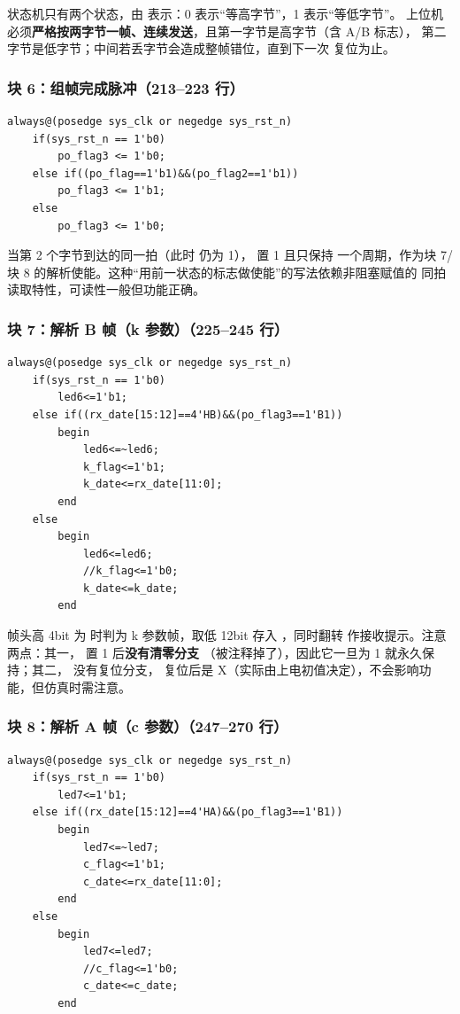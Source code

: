 状态机只有两个状态，由  表示：0 表示“等高字节”，1 表示“等低字节”。
上位机必须\textbf{严格按两字节一帧、连续发送}，且第一字节是高字节（含 A/B 标志），
第二字节是低字节；中间若丢字节会造成整帧错位，直到下一次  复位为止。

\subsubsection{块 6：组帧完成脉冲（213--223 行）}

\begin{lstlisting}[style=vsnip]
always@(posedge sys_clk or negedge sys_rst_n)
    if(sys_rst_n == 1'b0)
        po_flag3 <= 1'b0;
    else if((po_flag==1'b1)&&(po_flag2==1'b1))
        po_flag3 <= 1'b1;
    else
        po_flag3 <= 1'b0;
\end{lstlisting}

当第 2 个字节到达的同一拍（此时  仍为 1）， 置 1 且只保持
一个周期，作为块 7/块 8 的解析使能。这种“用前一状态的标志做使能”的写法依赖非阻塞赋值的
同拍读取特性，可读性一般但功能正确。

\subsubsection{块 7：解析 B 帧（k 参数）（225--245 行）}

\begin{lstlisting}[style=vsnip]
always@(posedge sys_clk or negedge sys_rst_n)
    if(sys_rst_n == 1'b0)
        led6<=1'b1;
    else if((rx_date[15:12]==4'HB)&&(po_flag3==1'B1))
        begin
            led6<=~led6;
            k_flag<=1'b1;
            k_date<=rx_date[11:0];
        end
    else
        begin
            led6<=led6;
            //k_flag<=1'b0;
            k_date<=k_date;
        end
\end{lstlisting}

帧头高 4bit 为  时判为 k 参数帧，取低 12bit 存入 ，同时翻转
 作接收提示。注意两点：其一， 置 1 后\textbf{没有清零分支}
（被注释掉了），因此它一旦为 1 就永久保持；其二， 没有复位分支，
复位后是 X（实际由上电初值决定），不会影响功能，但仿真时需注意。

\subsubsection{块 8：解析 A 帧（c 参数）（247--270 行）}

\begin{lstlisting}[style=vsnip]
always@(posedge sys_clk or negedge sys_rst_n)
    if(sys_rst_n == 1'b0)
        led7<=1'b1;
    else if((rx_date[15:12]==4'HA)&&(po_flag3==1'B1))
        begin
            led7<=~led7;
            c_flag<=1'b1;
            c_date<=rx_date[11:0];
        end
    else
        begin
            led7<=led7;
            //c_flag<=1'b0;
            c_date<=c_date;
        end
\end{lstlisting}

